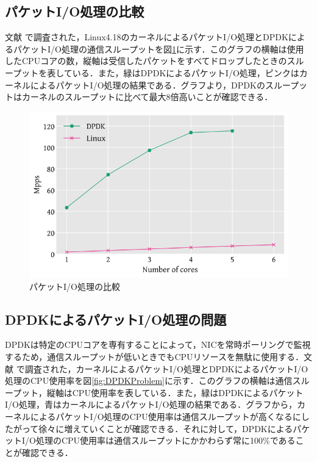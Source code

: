 \subsection{パケットI/O処理の比較}
文献 \cite{XDP} で調査された，Linux4.18のカーネルによるパケットI/O処理とDPDKによるパケットI/O処理の通信スループットを図\ref{fig:PacketIOComparison}に示す．このグラフの横軸は使用したCPUコアの数，縦軸は受信したパケットをすべてドロップしたときのスループットを表している．また，緑はDPDKによるパケットI/O処理，ピンクはカーネルによるパケットI/O処理の結果である．グラフより，DPDKのスループットはカーネルのスループットに比べて最大8倍高いことが確認できる．

\begin{figure}[htb]
  \centering
  \includegraphics[width=\columnwidth]{pictures/PacketIOComparison.png}
  \caption{パケットI/O処理の比較}
  \label{fig:PacketIOComparison}
\end{figure}

\subsection{DPDKによるパケットI/O処理の問題}
DPDKは特定のCPUコアを専有することによって，NICを常時ポーリングで監視するため，通信スループットが低いときでもCPUリソースを無駄に使用する．文献 \cite{XDP} で調査された，カーネルによるパケットI/O処理とDPDKによるパケットI/O処理のCPU使用率を図\ref{fig:DPDKProblem}に示す．このグラフの横軸は通信スループット，縦軸はCPU使用率を表している．また，緑はDPDKによるパケットI/O処理，青はカーネルによるパケットI/O処理の結果である．グラフから，カーネルによるパケットI/O処理のCPU使用率は通信スループットが高くなるにしたがって徐々に増えていくことが確認できる．それに対して，DPDKによるパケットI/O処理のCPU使用率は通信スループットにかかわらず常に100\%であることが確認できる．

